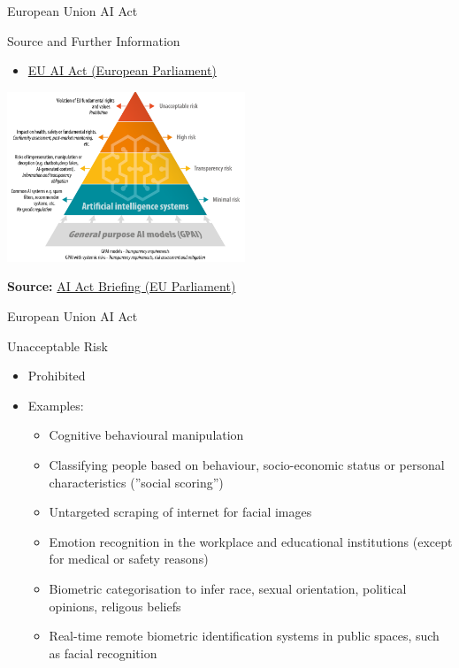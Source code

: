 \documentclass[ignorenonframetext,xcolor=x11names]{beamer}
\begin{document}
\begin{frame}{European Union AI Act}
\begin{block}{Source and Further Information}
\begin{itemize}
\item \href{https://www.europarl.europa.eu/topics/en/article/20230601STO93804/eu-ai-act-first-regulation-on-artificial-intelligence}{EU AI Act (European Parliament)}
\end{itemize}
\end{block}

\vspace{\baselineskip}
\centering
\includegraphics[height=2in]{screen2.png}

\vspace{\baselineskip}
\scriptsize \textbf{Source:} \href{https://www.europarl.europa.eu/RegData/etudes/BRIE/2021/698792/EPRS_BRI(2021)698792_EN.pdf}{AI Act Briefing (EU Parliament)}
\end{frame}


\begin{frame}{European Union AI Act}
\begin{block}{Unacceptable Risk}
\begin{itemize}
  \item Prohibited
  \item Examples:
	\begin{itemize}
	   \item Cognitive behavioural manipulation
	   \item Classifying people based on behaviour, socio-economic status or personal characteristics (''social scoring'')
	   \item Untargeted scraping of internet for facial images 
	   \item Emotion recognition in the workplace and educational institutions (except for medical or safety reasons)
	   \item Biometric categorisation to infer race, sexual orientation, political opinions, religous beliefs
	   \item Real-time remote biometric identification systems in public spaces, such as facial recognition
	\end{itemize}
\end{itemize}
\end{block}
\end{frame}
\end{document}
